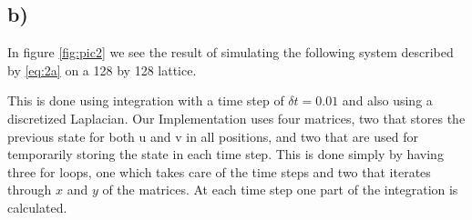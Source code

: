 \subsection*{b)}

In figure \ref{fig:pic2} we see the result of simulating the following system described by \eqref{eq:2a} on a 128 by 128 lattice.

This is done using integration with a time step of $\delta t = 0.01$ and also using a discretized Laplacian. Our Implementation uses four matrices, two that stores the previous state for both u and v in all positions, and two that are used for temporarily storing the state in each time step. This is done simply by having three for loops, one which takes care of the time steps and two that iterates through $x$ and $y$ of the matrices. At each time step one part of the integration is calculated.



